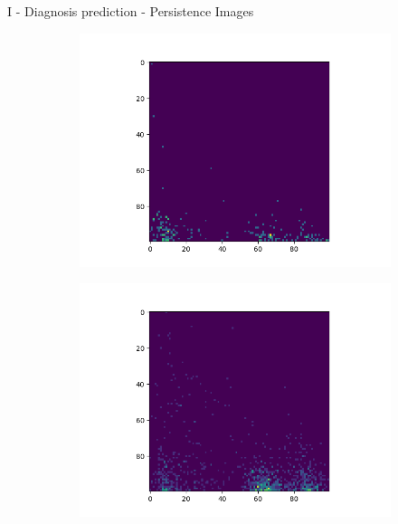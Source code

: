 \documentclass[aspectratio=169, 10pt, dvipsnames]{beamer}
\begin{document}
\begin{frame}[fragile]{I - Diagnosis prediction - Persistence Images}
\begin{figure}
  \centering
  \begin{subfigure}{0.32\textwidth}
    \includegraphics[width=\textwidth]{figures/PIs/Persistence_image_CN_h_0.png}
  \end{subfigure}
  \begin{subfigure}{0.32\textwidth}
    \includegraphics[width=\textwidth]{figures/PIs/Persistence_image_CN_h_1.png}
  \end{subfigure}
    \begin{subfigure}{0.32\textwidth}

\end{subfigure}
\end{figure}
\end{frame}
\end{document}
